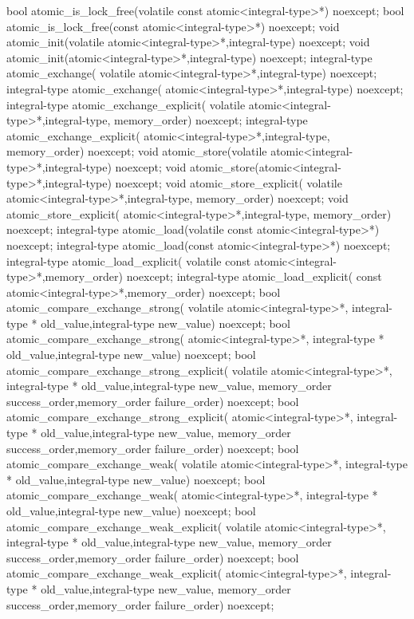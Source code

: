 \begin{cpp}
bool atomic_is_lock_free(volatile const atomic<integral-type>*) noexcept;
bool atomic_is_lock_free(const atomic<integral-type>*) noexcept;
void atomic_init(volatile atomic<integral-type>*,integral-type) noexcept;
void atomic_init(atomic<integral-type>*,integral-type) noexcept;
integral-type atomic_exchange(
    volatile atomic<integral-type>*,integral-type) noexcept;
integral-type atomic_exchange(
    atomic<integral-type>*,integral-type) noexcept;
integral-type atomic_exchange_explicit(
    volatile atomic<integral-type>*,integral-type, memory_order) noexcept;
integral-type atomic_exchange_explicit(
    atomic<integral-type>*,integral-type, memory_order) noexcept;
void atomic_store(volatile atomic<integral-type>*,integral-type) noexcept;
void atomic_store(atomic<integral-type>*,integral-type) noexcept;
void atomic_store_explicit(
    volatile atomic<integral-type>*,integral-type, memory_order) noexcept;
void atomic_store_explicit(
    atomic<integral-type>*,integral-type, memory_order) noexcept;
integral-type atomic_load(volatile const atomic<integral-type>*) noexcept;
integral-type atomic_load(const atomic<integral-type>*) noexcept;
integral-type atomic_load_explicit(
    volatile const atomic<integral-type>*,memory_order) noexcept;
integral-type atomic_load_explicit(
    const atomic<integral-type>*,memory_order) noexcept;
bool atomic_compare_exchange_strong(
    volatile atomic<integral-type>*,
    integral-type * old_value,integral-type new_value) noexcept;
bool atomic_compare_exchange_strong(
    atomic<integral-type>*,
    integral-type * old_value,integral-type new_value) noexcept;
bool atomic_compare_exchange_strong_explicit(
    volatile atomic<integral-type>*,
    integral-type * old_value,integral-type new_value,
    memory_order success_order,memory_order failure_order) noexcept;
bool atomic_compare_exchange_strong_explicit(
    atomic<integral-type>*,
    integral-type * old_value,integral-type new_value,
    memory_order success_order,memory_order failure_order) noexcept;
bool atomic_compare_exchange_weak(
    volatile atomic<integral-type>*,
    integral-type * old_value,integral-type new_value) noexcept;
bool atomic_compare_exchange_weak(
    atomic<integral-type>*,
    integral-type * old_value,integral-type new_value) noexcept;
bool atomic_compare_exchange_weak_explicit(
    volatile atomic<integral-type>*,
    integral-type * old_value,integral-type new_value,
    memory_order success_order,memory_order failure_order) noexcept;
bool atomic_compare_exchange_weak_explicit(
    atomic<integral-type>*,
    integral-type * old_value,integral-type new_value,
    memory_order success_order,memory_order failure_order) noexcept;


\end{cpp}
